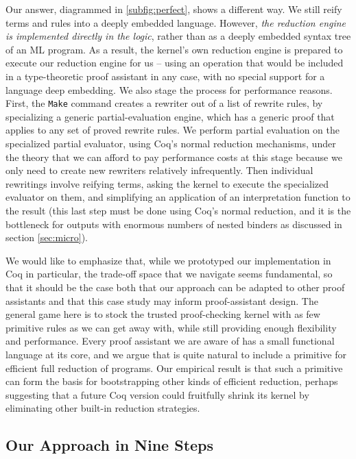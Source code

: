 Our answer, diagrammed in \autoref{subfig:perfect}, shows a different way.
We still reify terms and rules into a deeply embedded language.
However, \emph{the reduction engine is implemented directly in the logic}, rather than as a deeply embedded syntax tree of an ML program.
As a result, the kernel's own reduction engine is prepared to execute our reduction engine for us -- using an operation that would be included in a type-theoretic proof assistant in any case, with no special support for a language deep embedding.
We also stage the process for performance reasons.
First, the \texttt{Make} command creates a rewriter out of a list of rewrite rules, by specializing a generic partial-evaluation engine, which has a generic proof that applies to any set of proved rewrite rules.
We perform partial evaluation on the specialized partial evaluator, using Coq's normal reduction mechanisms, under the theory that we can afford to pay performance costs at this stage because we only need to create new rewriters relatively infrequently.
Then individual rewritings involve reifying terms, asking the kernel to execute the specialized evaluator on them, and simplifying an application of an interpretation function to the result (this last step must be done using Coq's normal reduction, and it is the bottleneck for outputs with enormous numbers of nested binders as discussed in section \ref{sec:micro}).

We would like to emphasize that, while we prototyped our implementation in Coq in particular, the trade-off space that we navigate seems fundamental, so that it should be the case both that our approach can be adapted to other proof assistants and that this case study may inform proof-assistant design.
The general game here is to stock the trusted proof-checking kernel with as few primitive rules as we can get away with, while still providing enough flexibility and performance.
Every proof assistant we are aware of has a small functional language at its core, and we argue that is quite natural to include a primitive for efficient full reduction of programs.
Our empirical result is that such a primitive can form the basis for bootstrapping other kinds of efficient reduction, perhaps suggesting that a future Coq version could fruitfully shrink its kernel by eliminating other built-in reduction strategies.

\subsection{Our Approach in Nine Steps} \label{sec:nine-steps}

